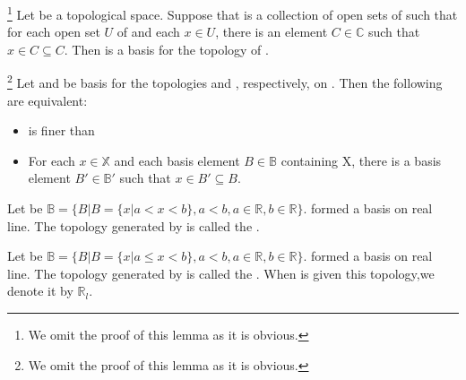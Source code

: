       \begin{lemma} \footnote{We omit the proof of this lemma as it is obvious.}
            Let  be a topological space. Suppose that  is a collection of open sets of  such that for each open set $ U $ of  and each $ x \in U $, there is an element $ C \in \mathbb{C} $ such that $ x \in C \subseteq C $. Then  is a basis for the topology of .
      \end{lemma}

      \begin{lemma} \footnote{We omit the proof of this lemma as it is obvious.}
            Let  and  be basis for the topologies  and , respectively, on . Then the following are equivalent:
            \begin{itemize}
                  \item {} is finer than 
                  \item For each $ x \in \mathbb{X} $ and each basis element $ B \in \mathbb{B} $ containing X, there is a basis element $ B' \in \mathbb{B'} $ such that $ x \in B' \subseteq B $.
            \end{itemize}
      \end{lemma}

      \begin{definition}
            Let be $ \mathbb{B} = \{ B | B = \{ x | a < x < b \}, a < b, a \in \mathbb{R}, b \in \mathbb{R} \} $.  formed a basis on real line. The topology generated by  is called the   .
      \end{definition}

      \begin{definition}
            Let be $ \mathbb{B} = \{ B | B = \{ x | a \le x < b \}, a < b, a \in \mathbb{R}, b \in \mathbb{R} \} $.  formed a basis on real line. The topology generated by  is called the . When  is given this topology,we denote it by $ \mathbb{R}_{l} $.
      \end{definition}

